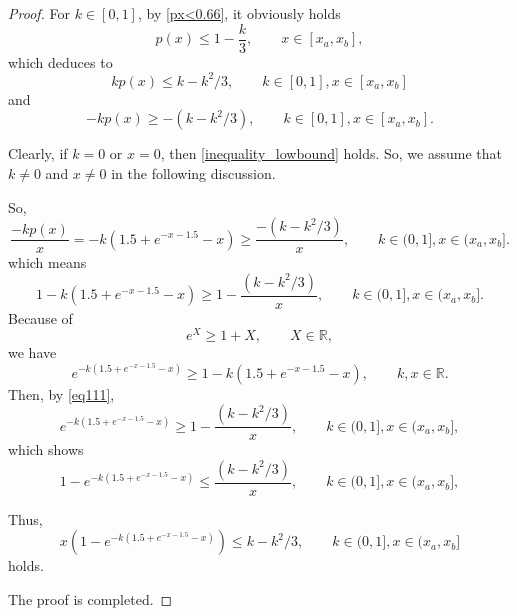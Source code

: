 \documentclass{HZNUMCM}
\begin{document}
\begin{proof}
For $k\in[0,1]$, by \eqref{px<0.66}, it obviously  holds
$$p(x)\leqslant 1-\frac k 3,\qquad x\in [x_a,x_b],$$
which deduces to
$$
k p(x)\leqslant k-k^2/3,\qquad k\in[0,1],x\in[x_a,x_b]
$$
and
$$
-k p(x)\geqslant -(k-k^2/3),\qquad k\in[0,1],x\in[x_a,x_b].
$$

Clearly, if $k=0$ or $x=0$, then \eqref{inequality_lowbound} holds. So, we assume that $k\neq 0$ and $x\neq0$ in the following discussion.

So,
$$
\frac{-k p(x)}{x}=-k(1.5+e^{-x-1.5}-x)\geqslant \frac{-(k-k^2/3)}{x},\qquad k\in(0,1],x\in(x_a,x_b].
$$
which means
\begin{equation}\label{eq111}
1-k(1.5+e^{-x-1.5}-x)\geqslant 1-\frac{(k-k^2/3)}{x},\qquad k\in(0,1],x\in(x_a,x_b].
\end{equation}
Because of $$e^{X}\geqslant 1+X,\qquad X\in\mathbb R,$$
we have
$$e^{-k(1.5+e^{-x-1.5}-x)}\geqslant 1-k(1.5+e^{-x-1.5}-x),\qquad k,x\in\mathbb R.$$
Then, by \eqref{eq111},
$$e^{-k(1.5+e^{-x-1.5}-x)}\geqslant  1-\frac{(k-k^2/3)}{x},\qquad k\in(0,1],x\in(x_a,x_b],$$
which shows
$$1-e^{-k(1.5+e^{-x-1.5}-x)}\leqslant  \frac{(k-k^2/3)}{x},\qquad k\in(0,1],x\in(x_a,x_b],$$

Thus,
\begin{equation}\label{kleq0.4}
x(1-e^{-k(1.5+e^{-x-1.5}-x)})\leqslant  k-k^2/3,\qquad k\in(0,1],x\in(x_a,x_b]
\end{equation}holds.

The proof is completed.
\end{proof}
\end{document}
